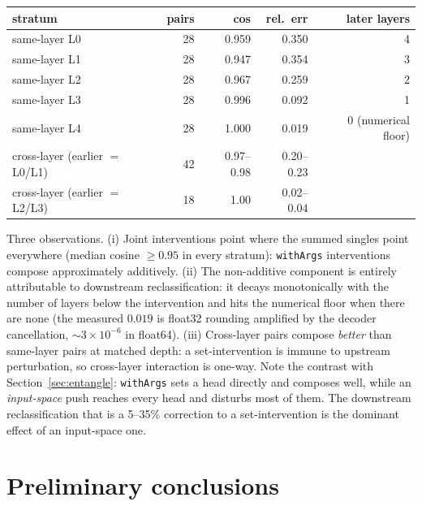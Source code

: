 \begin{center}
\begin{tabular}{@{}lrrrr@{}}
\toprule
stratum & pairs & cos & rel.\ err & later layers \\
\midrule
same-layer L0 & 28 & 0.959 & 0.350 & 4 \\
same-layer L1 & 28 & 0.947 & 0.354 & 3 \\
same-layer L2 & 28 & 0.967 & 0.259 & 2 \\
same-layer L3 & 28 & 0.996 & 0.092 & 1 \\
same-layer L4 & 28 & 1.000 & 0.019 & 0 (numerical floor) \\
cross-layer (earlier $=$ L0/L1) & 42 & 0.97--0.98 & 0.20--0.23 & \\
cross-layer (earlier $=$ L2/L3) & 18 & 1.00 & 0.02--0.04 & \\
\bottomrule
\end{tabular}
\end{center}

Three observations. (i) Joint interventions point where the summed
singles point everywhere (median cosine $\ge 0.95$ in every stratum):
\texttt{withArgs} interventions compose approximately additively. (ii) The
non-additive component is entirely attributable to downstream
reclassification: it decays monotonically with the number of layers below
the intervention and hits the numerical floor when there are none (the
measured $0.019$ is float32 rounding amplified by the decoder
cancellation, ${\sim}3{\times}10^{-6}$ in float64). (iii) Cross-layer
pairs compose \emph{better} than same-layer pairs at matched depth: a
set-intervention is immune to upstream perturbation, so cross-layer
interaction is one-way. Note the contrast with
Section~\ref{sec:entangle}: \texttt{withArgs} sets a head directly and
composes well, while an \emph{input-space} push reaches every head and
disturbs most of them. The downstream reclassification that is a 5--35\%
correction to a set-intervention is the dominant effect of an input-space
one.

\section{Preliminary conclusions}

